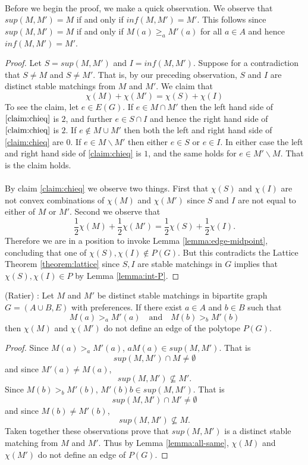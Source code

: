 \paragraph{}
Before we begin the proof, we make a quick observation. We observe that $sup(M,M') = M$ if and only if $inf(M,M') = M'$. This follows since $sup(M,M') = M$ if and only if $M(a) \geq_a M'(a)$ for all $a \in A$ and hence $inf(M,M') = M'$.
\begin{proof}
Let $S = sup(M,M')$ and $I = inf(M,M')$. Suppose for a contradiction that $S \neq M$ and $S \neq M'$. That is, by our preceding observation, $S$ and $I$ are distinct stable matchings from $M$ and $M'$. We claim that
\begin{equation} \label{claim:chieq}
\chi(M) + \chi(M') = \chi(S) + \chi(I)
 \end{equation}
To see the claim, let $e \in E(G)$. If $e \in M \cap M'$ then the left hand side of $\ref{claim:chieq}$ is $2$, and further $e \in S \cap I$ and hence the right hand side of $\ref{claim:chieq}$ is $2$. If $e \not\in M \cup M'$ then both the left and right hand side of \ref{claim:chieq} are $0$. If $e \in M \backslash M'$ then either $e \in S$ or $e \in I$. In either case the left and right hand side of \ref{claim:chieq} is $1$, and the same holds for $e \in M' \backslash M$. That is the claim holds.
\paragraph{}
By claim \ref{claim:chieq} we observe two things. First that $\chi(S)$ and $\chi(I)$ are not convex combinations of $\chi(M)$ and $\chi(M')$ since $S$ and $I$ are not equal to either of $M$ or $M'$. Second we observe that $$\frac{1}{2}\chi(M) + \frac{1}{2} \chi(M') = \frac{1}{2} \chi(S) + \frac{1}{2} \chi(I).$$
Therefore we are in a position to invoke Lemma \ref{lemma:edge-midpoint}, concluding that one of $\chi(S), \chi(I) \not\in P(G)$. But this contradicts the Lattice Theorem \ref{theorem:lattice} since $S, I$ are stable matchings in $G$ implies that $\chi(S), \chi(I) \in P$  by Lemma \ref{lemma:int-P}.
\end{proof}
\begin{corollary}\label{cor:edge} (Ratier) \cite{ratier1996stable}:
Let $M$ and $M'$ be distinct stable matchings in bipartite graph $G=(A\cup B, E)$ with preferences. If there exist $a \in A$ and $b \in B$ such that
\begin{equation}\label{cond:nonedge}
M(a) >_a M'(a)  \quad\text{and}\quad M(b) >_b M'(b)
\end{equation}
then $\chi(M)$ and $\chi(M')$ do not define an edge of the polytope $P(G)$.
\end{corollary}
\begin{proof}
Since $M(a) >_a M'(a)$, $aM(a) \in sup(M,M')$. That is $$sup(M,M') \cap M \neq \emptyset$$ and since $M'(a) \neq M(a)$, 
$$sup(M,M') \not\subseteq M'.$$
Since $M(b) >_b M'(b)$, $M'(b)b \in sup(M,M')$. That is $$sup(M,M') \cap M' \neq \emptyset$$ and since $M(b) \neq M'(b)$,
$$sup(M,M') \not\subseteq M.$$
Taken together these observations prove that $sup(M,M')$ is a distinct stable matching from $M$ and $M'$. Thus by Lemma \ref{lemma:all-same}, $\chi(M)$ and $\chi(M')$ do not define an edge of $P(G)$.  
\end{proof}
